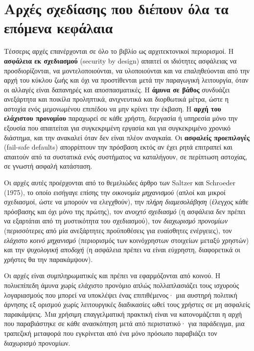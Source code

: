 \section{Αρχές σχεδίασης που διέπουν όλα τα επόμενα κεφάλαια}\label{sec:1.3}
Τέσσερις αρχές επανέρχονται σε όλο το βιβλίο ως αρχιτεκτονικοί περιορισμοί. Η \textbf{ασφάλεια εκ σχεδιασμού} (security by design) απαιτεί οι ιδιότητες ασφάλειας να προσδιορίζονται, να μοντελοποιούνται, να υλοποιούνται και να επαληθεύονται από την αρχή του κύκλου ζωής και όχι να προστίθενται μετά την παραγωγική λειτουργία, όταν οι αλλαγές είναι δαπανηρές και αποσπασματικές. Η \textbf{άμυνα σε βάθος} συνδυάζει ανεξάρτητα και ποικίλα προληπτικά, ανιχνευτικά και διορθωτικά μέτρα, ώστε η αστοχία ενός μεμονωμένου επιπέδου να μην κρίνει την έκβαση. Η \textbf{αρχή του ελάχιστου προνομίου} παραχωρεί σε κάθε χρήστη, διεργασία ή υπηρεσία μόνο την εξουσία που απαιτείται για συγκεκριμένη εργασία και για συγκεκριμένο χρονικό διάστημα, και την ανακαλεί όταν δεν είναι πλέον αναγκαία. Οι \textbf{ασφαλείς προεπιλογές} (fail-safe defaults) απορρίπτουν την πρόσβαση εκτός αν έχει ρητά επιτραπεί και απαιτούν από τα συστατικά ενός συστήματος να καταλήγουν, σε περίπτωση αστοχίας, σε γνωστή ασφαλή κατάσταση.

Οι αρχές αυτές προέρχονται από το θεμελιώδες άρθρο των Saltzer και Schroeder (1975), το οποίο εισήγαγε επίσης την \emph{οικονομία μηχανισμού} (απλοί και μικροί σχεδιασμοί, ώστε να μπορούν να ελεγχθούν), την \emph{πλήρη διαμεσολάβηση} (έλεγχος κάθε πρόσβασης και όχι μόνο της πρώτης), τον \emph{ανοιχτό σχεδιασμό} (η ασφάλεια δεν πρέπει να εξαρτάται από τη μυστικότητα του σχεδιασμού), τον \emph{διαχωρισμό προνομίων} (περισσότερες από μία ανεξάρτητες προϋποθέσεις για ευαίσθητες ενέργειες), τον \emph{ελάχιστο κοινό μηχανισμό} (περιορισμός των κοινόχρηστων στοιχείων μεταξύ χρηστών) και την \emph{ψυχολογική αποδοχή} (η ασφάλεια πρέπει να είναι εύχρηστη, διαφορετικά οι χρήστες θα την παρακάμψουν).

Οι αρχές είναι συμπληρωματικές και πρέπει να εφαρμόζονται από κοινού. Η πολυεπίπεδη άμυνα χωρίς ελάχιστο προνόμιο απλώς πολλαπλασιάζει τους ισχυρούς λογαριασμούς που μπορεί να υποκλέψει ένας επιτιθέμενος· μια αυστηρή πολιτική άρνησης εξ ορισμού χωρίς λειτουργικές διαδικασίες ωθεί τους χρήστες σε μη ασφαλείς παρακάμψεις. Μια χρήσιμη επαγγελματική πρακτική είναι να κατονομάζεται η αρχή που παραβιάστηκε σε κάθε ανασκόπηση μετά από περιστατικό· για παράδειγμα, μια τραπεζική μεταφορά που εγκρίνεται από ένα μόνο πρόσωπο παραβιάζει τον διαχωρισμό προνομίων.

